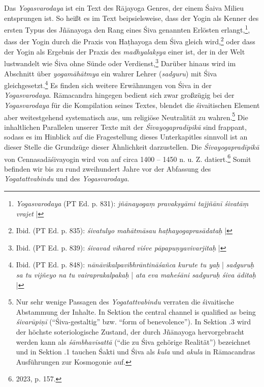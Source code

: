 Das \textit{Yogasvarodaya} ist ein Text des Rājayoga Genres, der einem Śaiva Milieu entsprungen ist. So heißt es im Text beipsielsweise, dass der Yogin als Kenner des ersten Typus des Jñānayoga den Rang eines Śiva genannten Erlösten erlangt,\footnote{ \textit{Yogasvarodaya} (PT Ed. p. 831): \textit{jñānayogaṃ pravakṣyāmi tajjñānī śivatāṃ vrajet} |}, dass der Yogin durch die Praxis von Haṭhayoga dem Śiva gleich wird,\footnote{Ibid. (PT Ed. p. 835): \textit{śivatulyo mahātmāsau haṭhayogaprasādataḥ} |} oder dass der Yogin als Ergebnis der Praxis des \textit{madhyalakṣya} einer ist, der in der Welt lustwandelt wie Śiva ohne Sünde oder Verdienst,\footnote{Ibid. (PT Ed. p. 839): \textit{śivavad vihared viśve pāpapuṇyavivarjitaḥ} |} Darüber hinaus wird im Abschnitt über \textit{yogamāhātmya} ein wahrer Lehrer (\textit{sadguru}) mit Śiva gleichgesetzt.\footnote{Ibid. (PT Ed. p. 848): \textit{nānāvikalpavibhrāntināśañca kurute tu yaḥ} | \textit{sadguruḥ sa tu vijñeyo na tu vairaprakalpakaḥ} | \textit{ata eva maheśāni sadguruḥ śiva āditaḥ} |} Es finden sich weitere Erwähnungen von Śiva in der \textit{Yogasvarodaya}. Rāmacandra hingegen bedient sich zwar großzügig bei der \textit{Yogasvarodaya} für die Kompilation seines Textes, blendet die śivaitischen Element aber weitestgehend systematisch aus, um religiöse Neutralität zu wahren.\footnote{Nur sehr wenige Passagen des \textit{Yogatattvabindu} verraten die śivaitische Abstammung der Inhalte. In Sektion  the central channel is qualified as being \textit{śivarūpiṇī} (``Śiva-gestaltig'' bzw. ``form of benevolence''). In Sektion .3 wird der höchste soteriologische Zustand, der durch Jñānayoga hervorgebracht werden kann als \textit{śāmbhavīsattā} (``die zu Śiva gehörige Realität'') bezeichnet und in Sektion .1 tauchen Śakti und Śiva als \textit{kula} und \textit{akula} in Rāmacandras Ausführungen zur Kosmogonie auf.}   
Die inhaltlichen Parallelen unserer Texte mit der \textit{Śivayogapradīpikā} sind frappant, sodass es im Hinblick auf die Fragestellung dieses Unterkapitles sinnvoll ist an dieser Stelle die Grundzüge dieser Ähnlichkeit darzustellen. Die \textit{Śivayogapradīpikā} von Cennasadāśivayogin wird von \citeauthor{powell2023} auf circa 1400 – 1450 n. u. Z. datiert.\footnote{\citeauthor{powell2023} 2023, p. 157.} Somit befinden wir bis zu rund zweihundert Jahre vor der Abfassung des \textit{Yogatattvabindu} und des \textit{Yogasvarodaya}. 
